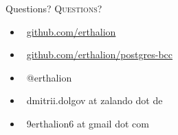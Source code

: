 \documentclass[usenames,dvipsnames, 18pt, compress, aspectratio=169]{beamer}
\def\twitter{{\FA \faTwitter}}
\def\github{{\FA \faGithub}}
\def\email{{\FA \faEnvelope}}
\begin{document}
\fontsize{18pt}{18}\selectfont
\begin{frame}
  \vspace*{2.5cm}
  \begin{minipage}[b][\paperheight]{\textwidth}
  \begin{center}

      \linespread{1.0}%
      \if@noSmallCapitals%
        Questions?
      \else%
        \scshape{\color{black} Questions?}%
      \fi%
      \vspace*{0.3em}

      \fontsize{13pt}{14}\selectfont
        \begin{itemize}[label={}]
            \item {\color{black} \github\ \href{github.com/erthalion}
                                               {\color{black}github.com/erthalion}}
            \item {\color{black} \github\ \href{github.com/erthalion/postgres-bcc}
                                               {\color{black}github.com/erthalion/postgres-bcc}}
            \item {\color{black} \twitter\ @erthalion}
            \item {\color{black} \email\ dmitrii.dolgov at zalando dot de}
            \item {\color{black} \email\ 9erthalion6 at gmail dot com}
        \end{itemize}
      \vspace*{2.5em}%

    \vfill
    \vspace*{2em}
  \end{center}
  \end{minipage}

\end{frame}
\end{document}
